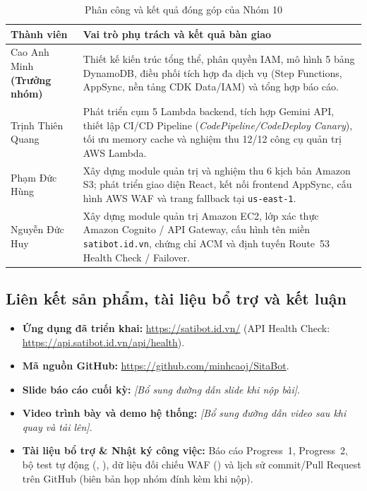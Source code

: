 \documentclass[a4paper,12pt]{article}
\newcommand{\code}[1]{\texttt{#1}}
\begin{document}
\begingroup
\setlength{\tabcolsep}{6pt}
\renewcommand{\arraystretch}{1.15}
\fontsize{10.5}{14}\selectfont
\begin{longtable}{@{}>{\raggedright\arraybackslash}p{4.0cm}>{\raggedright\arraybackslash}p{\dimexpr\linewidth-4.0cm-2\tabcolsep\relax}@{}}
\caption{Phân công và kết quả đóng góp của Nhóm 10}\label{tab:team-roles}\\
\toprule
\textbf{Thành viên} & \textbf{Vai trò phụ trách và kết quả bàn giao} \\
\midrule
\endfirsthead
\endhead
\endfoot
\bottomrule
\endlastfoot
Cao Anh Minh \textbf{(Trưởng nhóm)} & Thiết kế kiến trúc tổng thể, phân quyền IAM, mô hình 5 bảng DynamoDB, điều phối tích hợp đa dịch vụ (Step Functions, AppSync, nền tảng CDK Data/IAM) và tổng hợp báo cáo. \\
Trịnh Thiên Quang & Phát triển cụm 5 Lambda backend, tích hợp Gemini API, thiết lập CI/CD Pipeline (\textit{CodePipeline/CodeDeploy Canary}), tối ưu memory cache và nghiệm thu 12/12 công cụ quản trị AWS Lambda. \\
Phạm Đức Hùng & Xây dựng module quản trị và nghiệm thu 6 kịch bản Amazon S3; phát triển giao diện React, kết nối frontend AppSync, cấu hình AWS WAF và trang fallback tại \code{us-east-1}. \\
Nguyễn Đức Huy & Xây dựng module quản trị Amazon EC2, lớp xác thực Amazon Cognito / API Gateway, cấu hình tên miền \code{satibot.id.vn}, chứng chỉ ACM và định tuyến Route~53 Health Check / Failover. \\
\end{longtable}
\endgroup

\subsection{Liên kết sản phẩm, tài liệu bổ trợ và kết luận}

\begin{itemize}[itemsep=3pt,topsep=2pt]
  \item \textbf{Ứng dụng đã triển khai:} \url{https://satibot.id.vn/} (API Health Check: \url{https://api.satibot.id.vn/api/health}).
  \item \textbf{Mã nguồn GitHub:} \url{https://github.com/minhcaoj/SitaBot}.
  \item \textbf{Slide báo cáo cuối kỳ:} \textit{[Bổ sung đường dẫn slide khi nộp bài]}.
  \item \textbf{Video trình bày và demo hệ thống:} \textit{[Bổ sung đường dẫn video sau khi quay và tải lên]}.
  \item \textbf{Tài liệu bổ trợ \& Nhật ký công việc:} Báo cáo Progress~1, Progress~2, bộ test tự động (, ), dữ liệu đối chiếu WAF () và lịch sử commit/Pull Request trên GitHub (biên bản họp nhóm đính kèm khi nộp).
\end{itemize}
\end{document}
